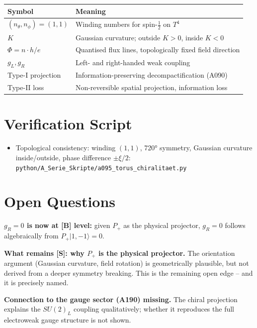 \begin{center}
\renewcommand{\arraystretch}{1.3}
{\small\begin{tabular}{lp{9cm}}
\toprule
Symbol & Meaning \\
\midrule
$(n_\theta,n_\phi)=(1,1)$ & Winding numbers for spin-$\tfrac12$ on $T^4$ \\
$K$ & Gaussian curvature; outside $K>0$, inside $K<0$ \\
$\Phi=n\cdot h/e$ & Quantised flux lines, topologically fixed field direction \\
$g_L, g_R$ & Left- and right-handed weak coupling \\
Type-I projection & Information-preserving decompactification (A090) \\
Type-II loss & Non-reversible spatial projection, information loss \\
\bottomrule
\end{tabular}}
\renewcommand{\arraystretch}{1.0}
\end{center}

\section{Verification Script}

\begin{itemize}[leftmargin=2em,itemsep=2pt,topsep=2pt]
  \item Topological consistency: winding $(1,1)$, 720° symmetry, Gaussian
    curvature inside/outside, phase difference $\pm\xi/2$:
    \texttt{python/A\_Serie\_Skripte/a095\_torus\_chiralitaet.py}
\end{itemize}

\section{Open Questions}

\textbf{$g_R=0$ is now at [B] level:} given $P_+$ as the physical projector,
$g_R=0$ follows algebraically from $P_+|1,{-}1\rangle=0$.

\textbf{What remains [S]: why $P_+$ is the physical projector.}
The orientation argument (Gaussian curvature, field rotation) is geometrically
plausible, but not derived from a deeper symmetry breaking. This is the
remaining open edge -- and it is precisely named.

\textbf{Connection to the gauge sector (A190) missing.} The chiral projection
explains the $SU(2)_L$ coupling qualitatively; whether it reproduces the full
electroweak gauge structure is not shown.

